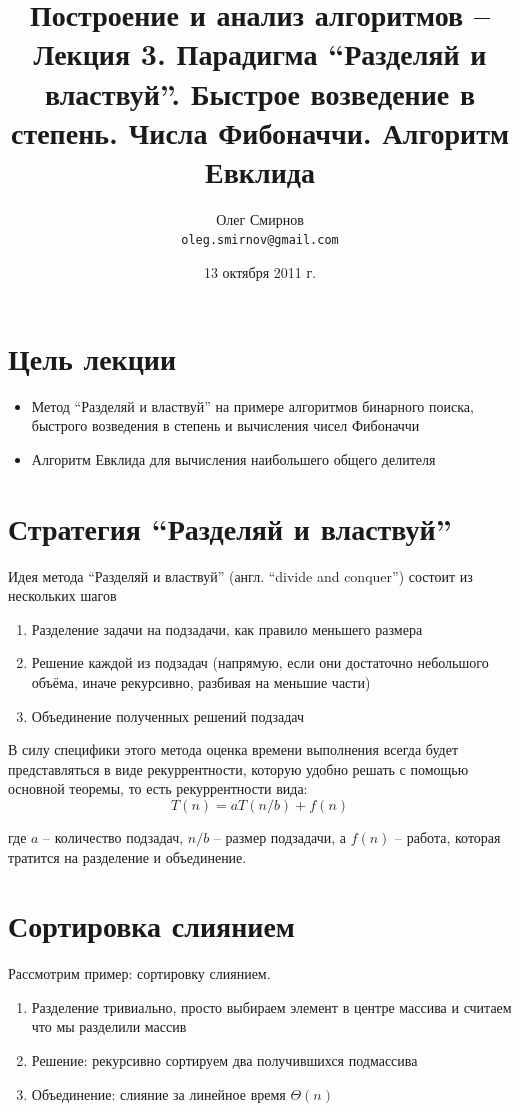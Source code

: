 \documentclass[a4paper,11pt]{article}
\author{Олег Смирнов\\
\texttt{oleg.smirnov@gmail.com}}
\date{13 октября 2011 г.}
\title{Построение и анализ алгоритмов -- Лекция 3. Парадигма ``Разделяй и 
властвуй''. Быстрое возведение в степень. Числа Фибоначчи. Алгоритм Евклида}
\begin{document}
\maketitle
\tableofcontents
\newpage

\section*{Цель лекции}
\begin{itemize}
\item Метод ``Разделяй и властвуй'' на примере алгоритмов бинарного поиска,
  быстрого возведения в степень и вычисления чисел Фибоначчи
\item Алгоритм Евклида для вычисления наибольшего общего делителя
\end{itemize}

\section{Стратегия ``Разделяй и властвуй''}
Идея метода ``Разделяй и властвуй'' (англ. ``divide and conquer'') состоит из
нескольких шагов

\begin{enumerate}
\item Разделение задачи на подзадачи, как правило меньшего размера
\item Решение каждой из подзадач (напрямую, если они достаточно небольшого 
объёма, иначе рекурсивно, разбивая на меньшие части)
\item Объединение полученных решений подзадач
\end{enumerate}

В силу специфики этого метода оценка времени выполнения всегда будет 
представляться в виде рекуррентности, которую удобно решать с помощью 
основной теоремы, то есть рекуррентности вида:
\begin{equation*}
  T(n) = aT(n/b) + f(n)
\end{equation*}

где $a$ -- количество подзадач, $n/b$ -- размер подзадачи, а $f(n)$ -- работа,
которая тратится на разделение и объединение.

\section{Сортировка слиянием}
Рассмотрим пример: сортировку слиянием.
\begin{enumerate}
\item Разделение тривиально, просто выбираем элемент в центре массива и считаем
  что мы разделили массив
\item Решение: рекурсивно сортируем два получившихся подмассива
\item Объединение: слияние за линейное время $\Theta(n)$
\end{enumerate}
\end{document}
